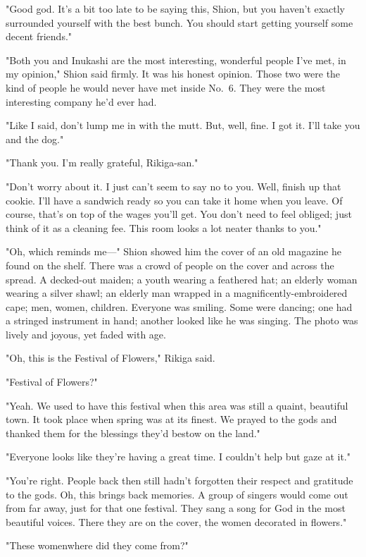 "\el Good god. It's a bit too late to be saying this, Shion, but you haven't exactly surrounded yourself with the best bunch. You should start getting yourself some decent friends."

"Both you and Inukashi are the most interesting, wonderful people I've met, in my opinion," Shion said firmly. It was his honest opinion. Those two were the kind of people he would never have met inside No.~6. They were the most interesting company he'd ever had.

"Like I said, don't lump me in with the mutt. But, well, fine. I got it. I'll take you and the dog."

"Thank you. I'm really grateful, Rikiga-san."

"Don't worry about it. I just can't seem to say no to you. Well, finish up that cookie. I'll have a sandwich ready so you can take it home when you leave. Of course, that's on top of the wages you'll get. You don't need to feel obliged; just think of it as a cleaning fee. This room looks a lot neater thanks to you."

"Oh, which reminds me---" Shion showed him the cover of an old magazine he found on the shelf. There was a crowd of people on the cover and across the spread. A decked-out maiden; a youth wearing a feathered hat; an elderly woman wearing a silver shawl; an elderly man wrapped in a magnificently-embroidered cape; men, women, children. Everyone was smiling. Some were dancing; one had a stringed instrument in hand; another looked like he was singing. The photo was lively and joyous, yet faded with age.

"Oh, this is the Festival of Flowers," Rikiga said.

"Festival of Flowers?"

"Yeah. We used to have this festival when this area was still a quaint, beautiful town. It took place when spring was at its finest. We prayed to the gods and thanked them for the blessings they'd bestow on the land."

"Everyone looks like they're having a great time. I couldn't help but gaze at it."

"You're right. People back then still hadn't forgotten their respect and gratitude to the gods. Oh, this brings back memories. A group of singers would come out from far away, just for that one festival. They sang a song for God in the most beautiful voices. There they are on the cover, the women decorated in flowers."

"These women\el where did they come from?"


